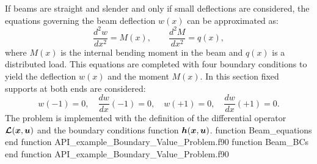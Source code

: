 If beams are straight and slender and only if small 
deflections are considered, the equations governing the beam deflection $ w(x) $ can be approximated as: 
 \begin{equation*}      	
      \frac{ d^2 w}{d  x^2}  = M(x), \qquad  \frac{d^2 M}{d x^2 } = q(x),
 \end{equation*}
where $ M(x) $ is the internal bending moment in the beam and $ q(x) $ is a distributed load.
This equations are completed with four  boundary conditions to yield the deflection $ w(x) $
and the moment $ M(x)$. In this section fixed supports at both ends are considered: 
\begin{equation*}      	
    w(-1) = 0, \quad\frac{dw}{d x }(-1)  = 0, \quad w(+1) = 0, \quad \frac{dw}{d x }(+1)  = 0.
\end{equation*} 
The  problem is implemented with the definition of the differential operator 
$\boldsymbol{\mathcal{L}} (\boldsymbol{x},\boldsymbol{u})$ and the boundary conditions function
 $\boldsymbol{h} (\boldsymbol{x},\boldsymbol{u}) $.
 \vspace{0.5cm} 
{function Beam_equations}
{end function}
{API_example_Boundary_Value_Problem.f90}
{function Beam_BCs}
{end function}
{API_example_Boundary_Value_Problem.f90}

%
        
